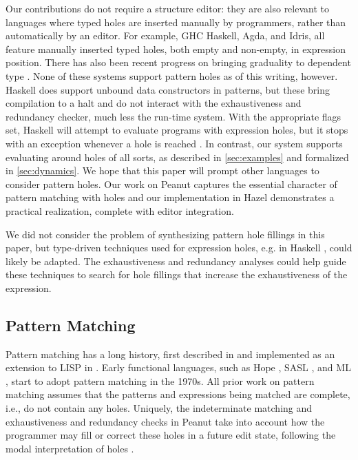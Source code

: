 Our contributions do not require a structure editor: they are also relevant to languages where typed holes are inserted 
manually by programmers, rather than automatically by an editor. 
For example, GHC Haskell, Agda, and Idris, all feature manually inserted typed holes, both empty and non-empty, in expression position.
%
There has also been recent progress on bringing graduality to dependent type
\cite{DBLP:journals/pacmpl/EremondiTG19,DBLP:journals/pacmpl/EremondiGT22,DBLP:journals/toplas/Lennon-Bertrand22,DBLP:journals/pacmpl/MaillardLTT22}.
%
None of these systems support pattern holes as of this writing, however. Haskell does support unbound data constructors in patterns, but these bring compilation to a halt and do not interact with the exhaustiveness and redundancy checker, much less the run-time system. With the appropriate flags set, Haskell will attempt to evaluate programs with expression holes, but it stops with an exception whenever a hole is reached \cite{DBLP:conf/icfp/VytiniotisJM12}. In contrast, our system supports evaluating around holes of all sorts, as described in \autoref{sec:examples} and formalized in \autoref{sec:dynamics}. We hope that this paper will prompt other languages to 
consider pattern holes. Our work on Peanut captures the essential character of pattern matching with holes and our implementation in Hazel 
demonstrates a practical realization, complete with editor integration.

We did not consider the problem of synthesizing pattern hole fillings in this paper, but type-driven techniques used for expression holes, e.g. in Haskell \cite{DBLP:conf/haskell/Gissurarson18}, could likely be adapted. The exhaustiveness and redundancy analyses could help guide these techniques to search for hole fillings that increase the exhaustiveness of the  expression.


\subsection{Pattern Matching}
Pattern matching has a long history, first described in \cite{DBLP:journals/cj/Burstall69} and implemented as an extension to LISP in \cite{DBLP:phd/ethos/McBride70}. Early functional languages,
such as Hope \cite{DBLP:conf/lfp/BurstallMS80}, SASL \cite{DBLP:journals/spe/Turner79}, and ML \cite{DBLP:journals/jcss/Milner78}, start to adopt pattern matching in the 1970s.
All prior work on pattern matching assumes that the patterns and expressions being matched are
complete, i.e., do not contain any holes.
Uniquely, the indeterminate matching and exhaustiveness and redundancy checks in Peanut
take into account how the programmer may fill or correct these holes in a future edit state,
following the modal interpretation of holes \cite{DBLP:journals/tocl/NanevskiPP08,DBLP:journals/pacmpl/OmarVCH19}.

